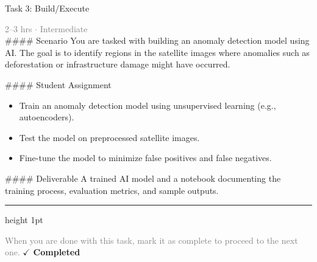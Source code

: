 \documentclass[10pt,a4paper]{article}
\begin{document}
\begin{taskbox}{Task 3: Build/Execute}

    {\small \textcolor{gray}{2--3 hrs $\cdot$ Intermediate}}\\[12pt]

    \#\#\#\# Scenario  
You are tasked with building an anomaly detection model using AI. The goal is to identify regions in the satellite images where anomalies such as deforestation or infrastructure damage might have occurred.  

\#\#\#\# Student Assignment  
\begin{itemize}
    \item Train an anomaly detection model using unsupervised learning (e.g., autoencoders).  
    \item Test the model on preprocessed satellite images.  
    \item Fine-tune the model to minimize false positives and false negatives.  
\end{itemize}

\#\#\#\# Deliverable  
A trained AI model and a notebook documenting the training process, evaluation metrics, and sample outputs.\par

    \vspace{16pt}

    \textcolor{cardBorder}{\hrule height 1pt}\vspace{8pt}

    \small \textcolor{gray}{When you are done with this task, mark it as complete to proceed to the next one.} \hfill \textbf{\textcolor{brandDark}{$\checkmark$ Completed}}

\end{taskbox}
\end{document}
